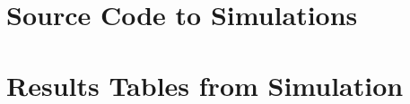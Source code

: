 \documentclass[11pt, a4paper]{book}
\begin{document}




%

%
%
%
%

%
\appendix 
\chapter{Source Code to Simulations}


\chapter{Results Tables from Simulation}



\backmatter




\printindex
\end{document}
